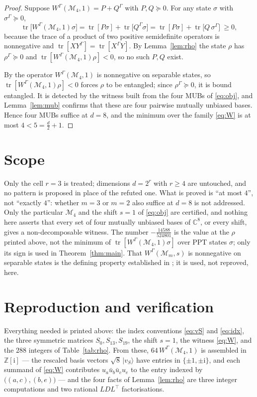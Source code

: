 \documentclass[11pt]{amsart}
\DeclareMathOperator{\Tr}{tr}
\newcommand{\CC}{\mathbb C}
\newcommand{\W}{W^{\Gamma}}
\newcommand{\M}{\mathcal M}
\newcommand{\ii}{\mathrm i}
\begin{document}
\begin{proof}
Suppose $\W(\M_4,1)=P+Q^{\Gamma}$ with $P,Q\succeq0$. For any state $\sigma$ with
$\sigma^{\Gamma}\succeq0$,
\[
  \Tr\bigl[\W(\M_4,1)\sigma\bigr]
  =\Tr[P\sigma]+\Tr\bigl[Q^{\Gamma}\sigma\bigr]
  =\Tr[P\sigma]+\Tr\bigl[Q\,\sigma^{\Gamma}\bigr]\ \ge 0 ,
\]
because the trace of a product of two positive semidefinite operators is nonnegative
and $\Tr[XY^{\Gamma}]=\Tr[X^{\Gamma}Y]$. By Lemma~\ref{lem:rho} the state $\rho$ has
$\rho^{\Gamma}\succeq0$ and $\Tr[\W(\M_4,1)\rho]<0$, so no such $P,Q$ exist.

By \cite{Spengler} the operator $\W(\M_4,1)$ is nonnegative on separable
states, so $\Tr[\W(\M_4,1)\rho]<0$ forces $\rho$ to be entangled; since
$\rho^{\Gamma}\succeq0$, it is bound entangled. It is detected by the witness built
from the four MUBs of \eqref{eq:obj}, and Lemma~\ref{lem:mub} confirms that these are
four pairwise mutually unbiased bases. Hence four MUBs suffice at $d=8$, and the
minimum over the family \eqref{eq:W} is at most $4<5=\frac d2+1$.
\end{proof}

\section{Scope}

Only the cell $r=3$ is treated; dimensions $d=2^r$ with $r\ge4$ are untouched, and no
pattern is proposed in place of the refuted one. What is proved is ``at most $4$'', not
``exactly $4$'': whether $m=3$ or $m=2$ also suffice at $d=8$ is not addressed. Only the
particular $\M_4$ and the shift $s=1$ of \eqref{eq:obj} are certified, and nothing here
asserts that every set of four mutually unbiased bases of $\CC^8$, or every shift, gives
a non-decomposable witness. The number $-\frac{14588}{524801}$ is the value at the
$\rho$ printed above, not the minimum of $\Tr[\W(\M_4,1)\sigma]$ over PPT states
$\sigma$; only its sign is used in Theorem~\ref{thm:main}. That $\W(\M_m,s)$ is
nonnegative on separable states is the defining property established in
\cite{Spengler}; it is used, not reproved, here.

\section{Reproduction and verification}

Everything needed is printed above: the index conventions \eqref{eq:vS} and
\eqref{eq:idx}, the three symmetric matrices $S_0,S_{13},S_{19}$, the shift $s=1$,
the witness \eqref{eq:W}, and the $288$ integers of Table~\ref{tab:rho}. From these,
$64\,\W(\M_4,1)$ is assembled in $\mathbb Z[\ii]$ --- the rescaled basis vectors
$\sqrt8\,|v_S\rangle$ have entries in $\{\pm1,\pm\ii\}$, and each summand of
\eqref{eq:W} contributes $u_a\bar u_b\bar u_c u_e$ to the entry indexed by
$\bigl((a,c),(b,e)\bigr)$ --- and the four facts of Lemma~\ref{lem:rho} are three
integer computations and two rational $LDL^{\!\top}$ factorisations.
\end{document}
